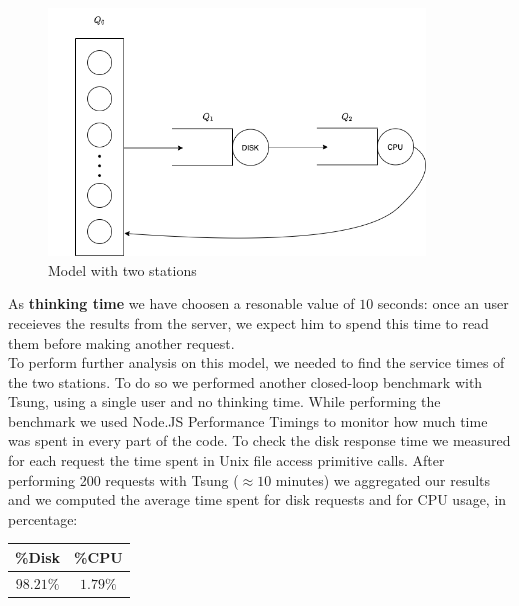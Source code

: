 \documentclass[11pt]{scrartcl} %
\begin{document}
\begin{figure}[h]
\includegraphics[width=10cm]{Images/img2.png}
\centering
\caption{Model with two stations}
\label{fig:img2}
\end{figure}

As \textbf{thinking time} we have choosen a resonable value of $10$ seconds: once an user receieves the results from the server, we expect him to spend this time to read them before making another request.\\

To perform further analysis on this model, we needed to find the service times of the two stations. To do so we performed another closed-loop benchmark with Tsung, using a single user and no thinking time. While performing the benchmark we used Node.JS Performance Timings to monitor how much time was spent in every part of the code. To check the disk response time we measured for each request the time spent in Unix file access primitive calls. After performing 200 requests with Tsung ($\approx 10$ minutes) we aggregated our results and we computed the average time spent for disk requests and for CPU usage, in percentage:


\begin{table}[H]
\centering
\begin{tabular}{c|c}
\multicolumn{1}{l|}{\%Disk} & \multicolumn{1}{l}{\%CPU} \\ \hline
$98.21\%$ & $1.79\%$\\
\end{tabular}
\end{table}
\end{document}
